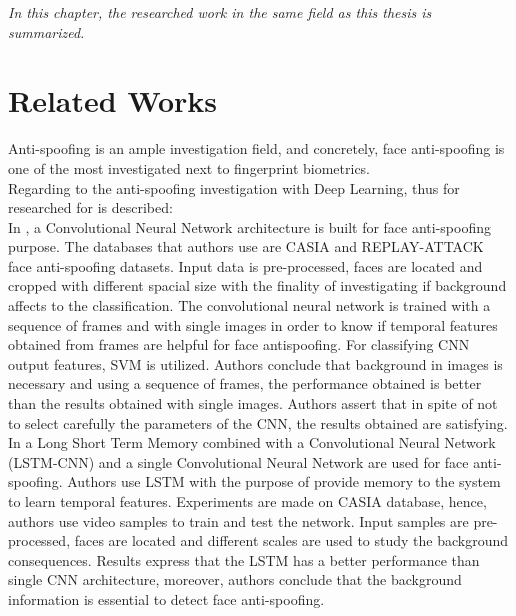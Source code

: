 
\begin{small}
\emph{In this chapter, the researched work in the same field as this thesis is summarized.}
\end{small}

\section{Related Works}
Anti-spoofing is an ample investigation field, and concretely, face anti-spoofing is one of the most investigated next to fingerprint biometrics.\\

Regarding to the anti-spoofing investigation with Deep Learning, thus for researched for is described:\\

In \cite{yangLL14}, a Convolutional Neural Network architecture is built for face anti-spoofing purpose.  The databases that authors use are CASIA and REPLAY-ATTACK face anti-spoofing datasets. Input data is pre-processed, faces are located and cropped with different spacial size with the finality of investigating if background affects to the classification. The convolutional neural network is trained with a sequence of frames and with single images in order to know if temporal features obtained from frames are helpful for face antispoofing. For classifying CNN output features, SVM is utilized. Authors conclude that background in images is necessary and using a sequence of frames, the performance obtained is better than the results obtained with single images. Authors assert that in spite of not to select carefully the parameters of the CNN, the results obtained are satisfying. \\

In \cite{LSTM-CNN} a Long Short Term Memory combined with a Convolutional Neural Network (LSTM-CNN) and a single Convolutional Neural Network are used for face anti-spoofing. Authors use LSTM with the purpose of provide memory to the system to learn temporal features. Experiments are made on CASIA database, hence, authors use video samples to train and test the network. Input samples are pre-processed, faces are located and different scales are used to study the background consequences. Results express that the LSTM has a better performance than single CNN architecture, moreover, authors conclude that the background information is essential to detect face anti-spoofing.\\

